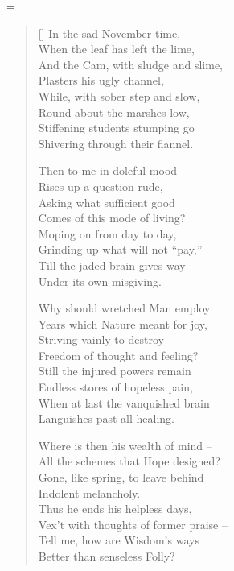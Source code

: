 
\renewcommand{\poemtitlefont}{\normalfont\large\itshape\centering} 
 

\settowidth{\versewidth}{In the sad November time,}
\stanzaskip=\bigskipamount

\begin{verse}[\versewidth]
In the sad November time, \\
When the leaf has left the lime, \\
And the Cam, with sludge and slime, \\
Plasters his ugly channel, \\
While, with sober step and slow, \\
Round about the marshes low, \\
Stiffening students stumping go \\
Shivering through their flannel.
 
Then to me in doleful mood \\
Rises up a question rude, \\
Asking what sufficient good \\
Comes of this mode of living? \\
Moping on from day to day, \\
Grinding up what will not ``pay,'' \\
Till the jaded brain gives way \\
Under its own misgiving.
 
Why should wretched Man employ \\
Years which Nature meant for joy, \\
Striving vainly to destroy \\
Freedom of thought and feeling? \\
Still the injured powers remain \\
Endless stores of hopeless pain, \\
When at last the vanquished brain \\
Languishes past all healing.
 
Where is then his wealth of mind -- \\
All the schemes that Hope designed? \\
Gone, like spring, to leave behind \\
Indolent melancholy. \\
Thus he ends his helpless days, \\
Vex't with thoughts of former praise -- \\
Tell me, how are Wisdom's ways \\
Better than senseless Folly? 
 

\end{verse}
